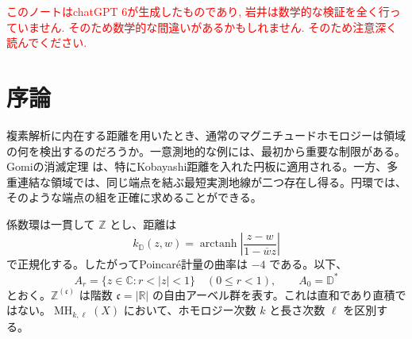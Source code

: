 \documentclass[12pt]{amsart}
\theoremstyle{definition}
\theoremstyle{remark}
\numberwithin{equation}{section}
\newcommand{\R}{\mathbb{R}}
\newcommand{\Z}{\mathbb{Z}}
\newcommand{\C}{\mathbb{C}}
\newcommand{\D}{\mathbb{D}}
\newcommand{\xr}[1]{\textcolor{red}{#1}}
\DeclareMathOperator{\MH}{MH}
\let\MergedMakeTitle\maketitle
\renewcommand{\maketitle}{\MergedMakeTitle\markboth{chatGPT 6 Astra}{\shorttitle}}%
\begin{document}
\date{7 September 2026, version 0.01}

\begin{abstract}
円環および穴あき円板にKobayashi距離を入れ、通常の整数係数マグニチュードホモロジーを計算する。$A_r=\{r<|z|<1\}$、$0<r<1$ に対し、次数 $2q$ の群が連続体濃度の階数を持つのは、ちょうど $\ell\ge q\pi^2/(2\log(1/r))$ のときであり、正の奇数次数はすべて消滅する。したがって、有界二重連結平面領域の共形型は長さ次数から決まる。さらに、これらの領域の間の正則写像は、双正則でない限り、すべての正次数で零写像を誘導することを示す。この結論は非自明な有限被覆にも適用される。群の計算にはGomiの非分岐測地空間の記述を用い、写像に関する主張には、そのサイクル代表元についての距離縮小補題を用いる。比較として、離散的な点集合を除いた円板のCarath\'eodory距離では正次数がすべて消滅することも示す。本稿は研究ノートであり、正則写像についての帰結の新規性は確定していない。
\end{abstract}
\maketitle
\xr{このノートはchatGPT 6が生成したものであり, 岩井は数学的な検証を全く行っていません. そのため数学的な間違いがあるかもしれません. そのため注意深く読んでください.}

\section{序論}\label{sec:intro}
複素解析に内在する距離を用いたとき、通常のマグニチュードホモロジーは領域の何を検出するのだろうか。一意測地的な例には、最初から重要な制限がある。Gomiの消滅定理 \cite[Corollary 5.24]{Gomi} は、特にKobayashi距離を入れた円板に適用される。一方、多重連結な領域では、同じ端点を結ぶ最短実測地線が二つ存在し得る。円環では、そのような端点の組を正確に求めることができる。

係数環は一貫して $\Z$ とし、距離は
\begin{equation}\label{eq:disk}
k_{\D}(z,w)=\operatorname{arctanh}\left|\frac{z-w}{1-\overline w z}\right|
\end{equation}
で正規化する。したがってPoincar\'e計量の曲率は $-4$ である。以下、
\[
 A_r=\{z\in\C:r<|z|<1\}\quad(0\le r<1),\qquad A_0=\D^*
\]
とおく。$\Z^{(\mathfrak c)}$ は階数 $\mathfrak c=|\R|$ の自由アーベル群を表す。これは直和であり直積ではない。$\MH_{k,\ell}(X)$ において、ホモロジー次数 $k$ と長さ次数 $\ell$ を区別する。
\end{document}
